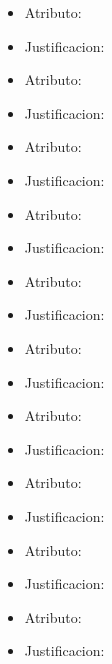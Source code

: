 \begin{itemize}
\item Atributo: 
\item Justificacion:


\item Atributo: 
\item Justificacion:

\item Atributo: 
\item Justificacion:

\item Atributo: 
\item Justificacion:

\item Atributo: 
\item Justificacion:

\item Atributo: 
\item Justificacion:

\item Atributo: 
\item Justificacion:

\item Atributo: 
\item Justificacion:

\item Atributo: 
\item Justificacion:

\item Atributo: 
\item Justificacion:
\end{itemize}

